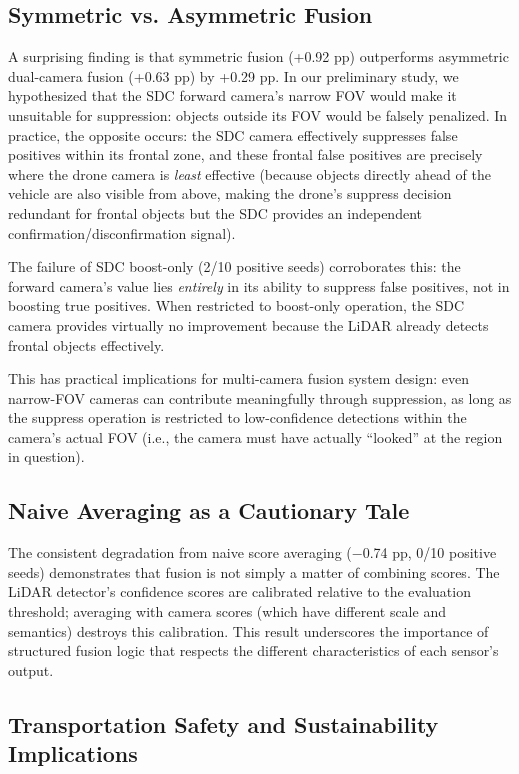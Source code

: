 \documentclass[sustainability,article,submit,moreauthors,pdftex]{Definitions/mdpi}
\begin{document}
\subsection{Symmetric vs. Asymmetric Fusion}

A surprising finding is that symmetric fusion (+0.92 pp) outperforms asymmetric dual-camera fusion (+0.63 pp) by +0.29 pp. In our preliminary study, we hypothesized that the SDC forward camera's narrow FOV would make it unsuitable for suppression: objects outside its FOV would be falsely penalized. In practice, the opposite occurs: the SDC camera effectively suppresses false positives within its frontal zone, and these frontal false positives are precisely where the drone camera is \emph{least} effective (because objects directly ahead of the vehicle are also visible from above, making the drone's suppress decision redundant for frontal objects but the SDC provides an independent confirmation/disconfirmation signal).

The failure of SDC boost-only (2/10 positive seeds) corroborates this: the forward camera's value lies \emph{entirely} in its ability to suppress false positives, not in boosting true positives. When restricted to boost-only operation, the SDC camera provides virtually no improvement because the LiDAR already detects frontal objects effectively.

This has practical implications for multi-camera fusion system design: even narrow-FOV cameras can contribute meaningfully through suppression, as long as the suppress operation is restricted to low-confidence detections within the camera's actual FOV (i.e., the camera must have actually ``looked'' at the region in question).

\subsection{Naive Averaging as a Cautionary Tale}

The consistent degradation from naive score averaging ($-$0.74 pp, 0/10 positive seeds) demonstrates that fusion is not simply a matter of combining scores. The LiDAR detector's confidence scores are calibrated relative to the evaluation threshold; averaging with camera scores (which have different scale and semantics) destroys this calibration. This result underscores the importance of structured fusion logic that respects the different characteristics of each sensor's output.

\subsection{Transportation Safety and Sustainability Implications}
\end{document}
